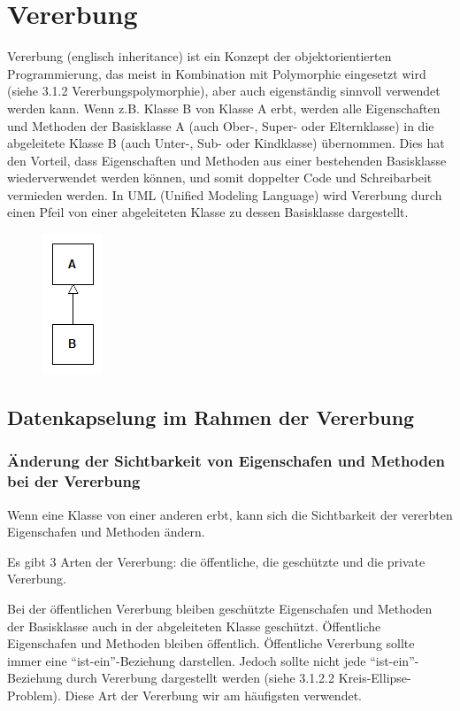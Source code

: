 \section{Vererbung}
	Vererbung (englisch inheritance) ist ein Konzept der objektorientierten Programmierung, das meist in Kombination mit
	Polymorphie eingesetzt wird (siehe 3.1.2 Vererbungspolymorphie), aber auch eigenständig sinnvoll verwendet werden kann.
	Wenn z.B. Klasse B von Klasse A erbt, werden alle Eigenschaften und Methoden der Basisklasse A (auch Ober-, Super- oder
	Elternklasse) in die abgeleitete Klasse B (auch Unter-, Sub- oder Kindklasse) übernommen. Dies hat den Vorteil, dass
	Eigenschaften und Methoden aus einer bestehenden Basisklasse wiederverwendet werden können, und somit doppelter Code und
	Schreibarbeit vermieden werden. In UML (Unified Modeling Language) wird Vererbung durch einen Pfeil von einer abgeleiteten
	Klasse zu dessen Basisklasse dargestellt.
	
	\begin{figure}[H]
		\includegraphics[scale=0.75]{vererbung/uml.png}
	\end{figure}
	
	\subsection{Datenkapselung im Rahmen der Vererbung}
		
		\subsubsection{Änderung der Sichtbarkeit von Eigenschafen und Methoden bei der Vererbung}
			
			Wenn eine Klasse von einer anderen erbt, kann sich die Sichtbarkeit der vererbten Eigenschafen und Methoden ändern.
			
			
			
			Es gibt 3 Arten der Vererbung: die öffentliche, die geschützte und die private Vererbung.
			
			Bei der öffentlichen Vererbung bleiben geschützte Eigenschafen und Methoden der Basisklasse auch in der
			abgeleiteten Klasse geschützt. Öffentliche Eigenschafen und Methoden bleiben öffentlich. Öffentliche Vererbung
			sollte immer eine ``ist-ein''-Beziehung darstellen. Jedoch sollte nicht jede ``ist-ein''-Beziehung durch Vererbung
			dargestellt werden (siehe 3.1.2.2 Kreis-Ellipse-Problem). Diese Art der Vererbung wir am häufigsten verwendet.
			
